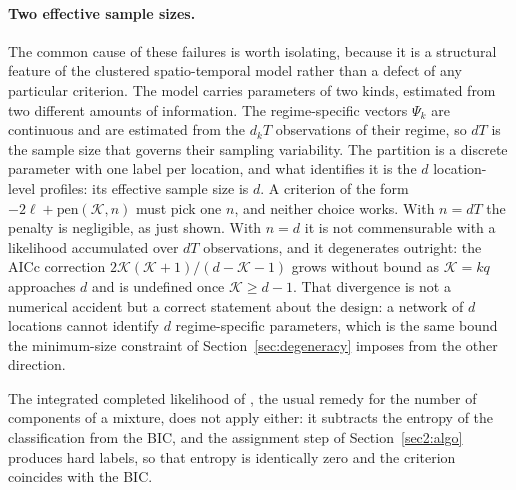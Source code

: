 \paragraph{Two effective sample sizes.} The common cause of these failures is worth isolating, because it is a structural feature of the clustered spatio-temporal model rather than a defect of any particular criterion. The model carries parameters of two kinds, estimated from two different amounts of information. The regime-specific vectors $\Psi_k$ are continuous and are estimated from the $d_k T$ observations of their regime, so $dT$ is the sample size that governs their sampling variability. The partition is a discrete parameter with one label per location, and what identifies it is the $d$ location-level profiles: its effective sample size is $d$. A criterion of the form $-2\ell + \mathrm{pen}(\mathcal{K}, n)$ must pick one $n$, and neither choice works. With $n = dT$ the penalty is negligible, as just shown. With $n = d$ it is not commensurable with a likelihood accumulated over $dT$ observations, and it degenerates outright: the AICc correction $2\mathcal{K}(\mathcal{K}+1)/(d - \mathcal{K} - 1)$ grows without bound as $\mathcal{K} = kq$ approaches $d$ and is undefined once $\mathcal{K} \ge d - 1$. That divergence is not a numerical accident but a correct statement about the design: a network of $d$ locations cannot identify $d$ regime-specific parameters, which is the same bound the minimum-size constraint of Section~\ref{sec:degeneracy} imposes from the other direction.

The integrated completed likelihood of \citet{BiernackiEtAl2000}, the usual remedy for the number of components of a mixture, does not apply either: it subtracts the entropy of the classification from the BIC, and the assignment step of Section~\ref{sec2:algo} produces hard labels, so that entropy is identically zero and the criterion coincides with the BIC.

